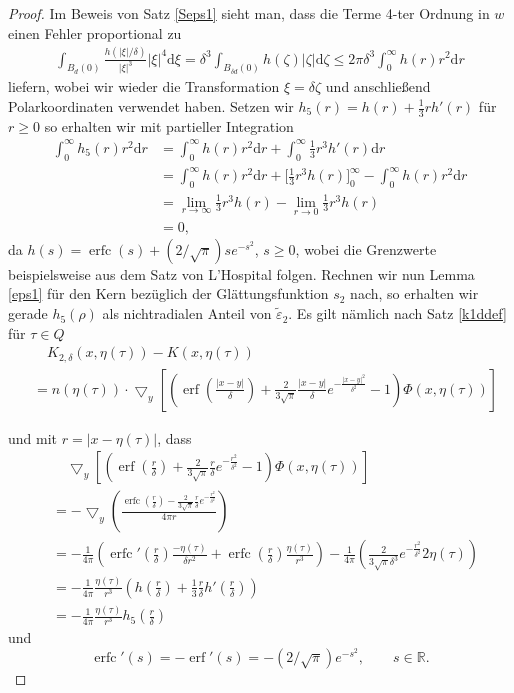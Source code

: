 \documentclass[12pt,a4paper]{scrartcl}
\newcommand{\dd}{\mathrm{d}}
\numberwithin{equation}{section}
\newcommand{\R}{\mathbb{R}} %
\newcommand{\grad}{\bigtriangledown}
\newcommand{\erf}{\operatorname{erf}}
\newcommand{\erfc}{\operatorname{erfc}}
\begin{document}
\begin{proof}
Im Beweis von Satz \ref{Seps1} sieht man, dass die Terme 4-ter Ordnung in $w$ einen Fehler proportional zu 
\begin{align*}
\int_{B_d(0)} \frac{h(|\xi|/\delta)}{|\xi|^3}|\xi|^4\dd \xi = \delta^3 \int_{B_{\delta d}(0)} h(\zeta) |\zeta| \dd \zeta \leq 2\pi \delta^3 \int_0^\infty h(r) r^2 \dd r
\end{align*} 
liefern, wobei wir wieder die Transformation $\xi=\delta\zeta$ und anschließend Polarkoordinaten verwendet haben. Setzen wir $h_5(r)= h(r) + \frac{1}{3}r h'(r)$ für $r \geq 0$ so erhalten wir mit partieller Integration
\begin{align*}
\int_0^\infty h_5(r) r^2 \dd r &= \int_0^\infty h(r)r^2 \dd r  + \int_0^\infty \frac{1}{3}r^3h'(r) \dd r \\
&=\int_0^\infty h(r)r^2 \dd r + \big[\frac{1}{3} r^3 h(r)\big]_0^\infty - \int_0^\infty h(r)r^2 \dd r \\
&= \lim_{r \to \infty} \frac{1}{3} r^3 h(r) - \lim_{r \to 0} \frac{1}{3} r^3 h(r) \\
&= 0,
\end{align*}
da $h(s)= \erfc(s)+(2/\sqrt{\pi})s e ^{-s^2 }$, $s \geq 0$, wobei die Grenzwerte beispielsweise aus dem Satz von L'Hospital folgen. Rechnen wir nun Lemma \ref{eps1} für den Kern bezüglich der Glättungsfunktion $s_2$ nach, so erhalten wir gerade $h_5(\rho)$ als nichtradialen Anteil von $\widetilde \varepsilon_2$. Es gilt nämlich nach Satz \ref{k1ddef} für $\tau \in Q$
\begin{align*}
& \quad K_{2,\delta}(x,\eta(\tau))- K(x,\eta(\tau)) \\
&= n(\eta(\tau)) \cdot \grad_y \left[ \left(\erf \left(\frac{|x-y|}{\delta}\right) +\frac{2}{3\sqrt{\pi}}\frac{|x-y|}{\delta}e^{-\frac{|x-y|^2}{\delta^2}} - 1\right) \Phi (x,\eta(\tau)) \right]
\end{align*}


und mit $r=|x - \eta(\tau)|$, dass
\begin{align*}
&\quad\grad_y\left[\left(\erf \left(\frac{r}{\delta}\right) +\frac{2}{3\sqrt{\pi}}\frac{r}{\delta}e^{-\frac{r^2}{\delta^2}} - 1\right) \Phi (x,\eta(\tau)) \right] \\
&= - \grad_y\left(\frac{\erfc(\frac{r}{\delta})-\frac{2}{3\sqrt{\pi}}\frac{r}{\delta}e^{-\frac{r^2}{\delta^2}}}{4 \pi r}\right) \\
&= - \frac{1}{4 \pi} \left(\erfc'\left(\frac{r}{\delta}\right)\frac{-\eta(\tau)}{\delta r^2} + \erfc\left(\frac{r}{\delta}\right)\frac{\eta(\tau)}{r^3} \right)
-\frac{1}{4 \pi} \left( \frac{2}{3 \sqrt{\pi} \delta^3} e^{-\frac{r^2}{\delta^2}}2 \eta(\tau)  \right) \\
&=-\frac{1}{4 \pi}\frac{\eta(\tau)}{r^3} \left( h \left(\frac{r}{\delta} \right) + \frac{1}{3}\frac{r}{\delta}h' \left(\frac{r}{\delta}\right) \right) \\
&=-\frac{1}{4 \pi}\frac{\eta(\tau)}{r^3} h_5 \left(\frac{r}{\delta} \right)
\end{align*} 
und 
\[
\erfc'(s)=-\erf'(s)=-(2/\sqrt{\pi})e^{-s^2}, \qquad s \in \R.
\]


\end{proof}
\end{document}
